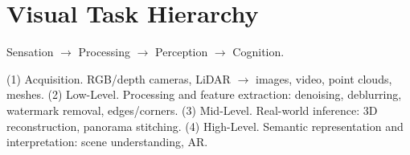 \section{Visual Task Hierarchy}
Sensation $\to$ Processing $\to$ Perception $\to$ Cognition.

(1) Acquisition. RGB/depth cameras, LiDAR $\to$ images, video, point clouds, meshes.
(2) Low-Level. Processing and feature extraction: denoising, deblurring, watermark removal, edges/corners.
(3) Mid-Level. Real-world inference: 3D reconstruction, panorama stitching.
(4) High-Level. Semantic representation and interpretation: scene understanding, AR.